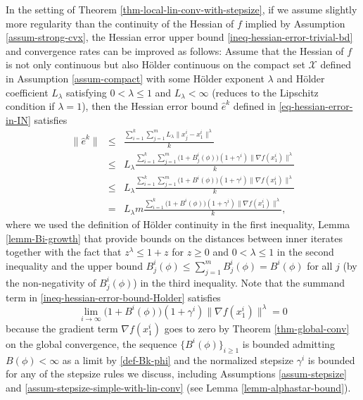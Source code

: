 \documentclass[final,numbook]{svjour3}
\begin{document}
\begin{remark}\label{rema-hessian-accurate-at-limit}
In the setting of Theorem \ref{thm-local-lin-conv-with-stepsize}, if we assume slightly more regularity than the continuity of the Hessian of $f$ implied by Assumption \ref{assum-strong-cvx}, the Hessian error upper bound \eqref{ineq-hessian-error-trivial-bd} and convergence rates can be improved as follows: Assume that the Hessian of $f$ is not only continuous but also H\"older continuous on the compact set $\mathcal{X}$ defined in Assumption \ref{assum-compact} with some H\"older exponent $\lambda$ and H\"older coefficient $L_\lambda$ satisfying $0<\lambda \leq 1$ and $L_\lambda<\infty$ (reduces to the Lipschitz condition if $\lambda=1$), then the Hessian error bound $\widehat{e}^k$ defined in \eqref{eq-hessian-error-in-IN} satisfies
\begin{eqnarray}  \| \widehat{e}^k \| &\leq& \frac{\sum_{i=1}^k  \sum_{j=1}^m L_\lambda \| x_j^i - x_1^i \|^{\lambda}}{k} \nonumber \\
 & \leq & L_\lambda \frac{\sum_{i=1}^k  \sum_{j=1}^m  \big( 1 + B_j^i(\phi)\big) (1 + \gamma^i) \| \nabla f(x_1^i) \|^{\lambda}}{k} \nonumber \\
 & \leq & L_\lambda   \frac{\sum_{i=1}^k  \sum_{j=1}^m  \big( 1 + B^i(\phi)\big) (1 + \gamma^i) \| \nabla f(x_1^i) \|^{\lambda}}{k} \nonumber \\
 & = & L_\lambda m  \frac{\sum_{i=1}^k \big( 1 + B^i(\phi)\big) (1 + \gamma^i) \| \nabla f(x_1^i)\|^{\lambda}}{k}, \label{ineq-hessian-error-bound-Holder}
\end{eqnarray}
where we used the definition of H\"older continuity in the first inequality, Lemma \ref{lemm-Bi-growth} that provide bounds on the distances between inner iterates together with the fact that $z^\lambda \leq 1 + z$ for $z\geq 0$ and $0<\lambda \leq 1$ in the second inequality and the upper bound $B_j^i(\phi) \leq \sum_{j=1}^m B_j^i(\phi) = B^i(\phi)$ for all $j$ (by the non-negativity of $B_j^i(\phi)$) in the third inequality. Note that the summand term in \eqref{ineq-hessian-error-bound-Holder} satisfies
	\begin{equation}\label{ineq-hessian-error-holder-cond} \lim_{i \to \infty} \big( 1 + B^i(\phi)\big) (1 + \gamma^i) \| \nabla f(x_1^i)\|^{\lambda} = 0 
	\end{equation}
because the gradient term $\nabla f(x_1^i)$ goes to zero by Theorem \ref{thm-global-conv} on the global convergence, the sequence $\{B^i(\phi)\}_{i\geq 1}$ is bounded admitting $B(\phi)<\infty$ as a limit by \eqref{def-Bk-phi} and the normalized stepsize $\gamma^i$ is bounded for any of the stepsize rules we discuss, including Assumptions \ref{assum-stepsize} and \ref{assum-stepsize-simple-with-lin-conv} (see Lemma \ref{lemm-alphastar-bound}). 

\end{remark}
\end{document}
